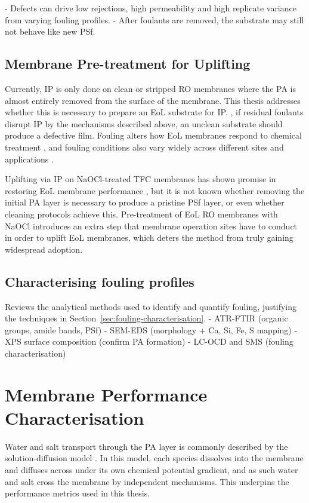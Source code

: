 - Defects can drive low rejections, high permeability and high replicate variance from varying fouling profiles.
- After foulants are removed, the substrate may still not behave like new PSf.


\subsection{Membrane Pre-treatment for Uplifting}
\label{sec:substrate-prep}
Currently, IP is only done on clean or stripped RO membranes where the PA is almost entirely removed from the surface of the membrane. This thesis addresses whether this is necessary to prepare an EoL substrate for IP. , if residual foulants disrupt IP by the mechanisms described above, an unclean substrate should produce a defective film. Fouling alters how EoL membranes respond to chemical treatment \citep{GarciaPacheco2015,Molinaa2018}, and fouling conditions also vary widely across different sites and applications \citep{Molinaa2018}.

Uplifting via IP on NaOCl-treated TFC membranes has shown promise in restoring EoL membrane performance \citep{Ogbe2025,Ogbe2026}, but it is not known whether removing the initial PA layer is necessary to produce a pristine PSf layer, or even whether cleaning protocols achieve this. Pre-treatment of EoL RO membranes with NaOCl introduces an extra step that membrane operation sites have to conduct in order to uplift EoL membranes, which deters the method from truly gaining widespread adoption.


\subsection{Characterising fouling profiles}
Reviews the analytical methods used to identify and quantify fouling, justifying the techniques in Section~\ref{sec:fouling-characterisation}.
- ATR-FTIR (organic groups, amide bands, PSf)
- SEM-EDS (morphology + Ca, Si, Fe, S mapping)
- XPS surface composition (confirm PA formation)
- LC-OCD and SMS (fouling characterisation)



\section{Membrane Performance Characterisation}
\label{sec:Performance-Characterisation}
Water and salt transport through the PA layer is commonly described by the solution-diffusion model . In this model, each species dissolves into the membrane and diffuses across under its own chemical potential gradient, and as such water and salt cross the membrane by independent mechanisms. This underpins the performance metrics used in this thesis.

